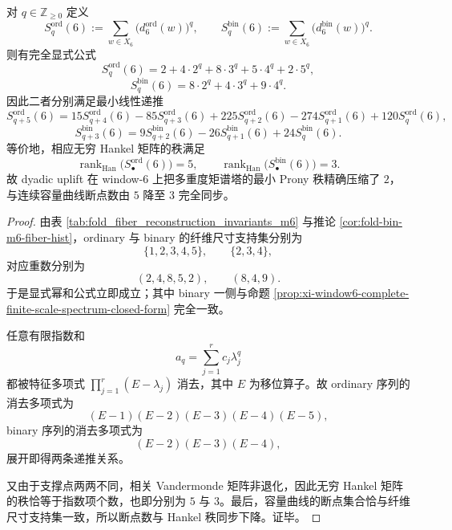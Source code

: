 \begin{theorem}\label{thm:conclusion-window6-moment-tower-prony-rank-compression}
对 \(q\in \mathbb Z_{\ge 0}\) 定义
\[
S_q^{\mathrm{ord}}(6):=\sum_{w\in X_6}\bigl(d_6^{\mathrm{ord}}(w)\bigr)^q,
\qquad
S_q^{\mathrm{bin}}(6):=\sum_{w\in X_6}\bigl(d_6^{\mathrm{bin}}(w)\bigr)^q.
\]
则有完全显式公式
\[
S_q^{\mathrm{ord}}(6)=2+4\cdot 2^q+8\cdot 3^q+5\cdot 4^q+2\cdot 5^q,
\]
\[
S_q^{\mathrm{bin}}(6)=8\cdot 2^q+4\cdot 3^q+9\cdot 4^q.
\]
因此二者分别满足最小线性递推
\[
S_{q+5}^{\mathrm{ord}}(6)
=15S_{q+4}^{\mathrm{ord}}(6)
-85S_{q+3}^{\mathrm{ord}}(6)
+225S_{q+2}^{\mathrm{ord}}(6)
-274S_{q+1}^{\mathrm{ord}}(6)
+120S_q^{\mathrm{ord}}(6),
\]
\[
S_{q+3}^{\mathrm{bin}}(6)
=9S_{q+2}^{\mathrm{bin}}(6)-26S_{q+1}^{\mathrm{bin}}(6)+24S_q^{\mathrm{bin}}(6).
\]
等价地，相应无穷 Hankel 矩阵的秩满足
\[
\operatorname{rank}_{\mathrm{Han}}\bigl(S_\bullet^{\mathrm{ord}}(6)\bigr)=5,
\qquad
\operatorname{rank}_{\mathrm{Han}}\bigl(S_\bullet^{\mathrm{bin}}(6)\bigr)=3.
\]
故 dyadic uplift 在 window-\(6\) 上把多重度矩谱塔的最小 Prony 秩精确压缩了 \(2\)，与连续容量曲线断点数由 \(5\) 降至 \(3\) 完全同步。
\end{theorem}
\begin{proof}
由表 \ref{tab:fold_fiber_reconstruction_invariants_m6} 与推论 \ref{cor:fold-bin-m6-fiber-hist}，ordinary 与 binary 的纤维尺寸支持集分别为
\[
\{1,2,3,4,5\},
\qquad
\{2,3,4\},
\]
对应重数分别为
\[
(2,4,8,5,2),
\qquad
(8,4,9).
\]
于是显式幂和公式立即成立；其中 binary 一侧与命题 \ref{prop:xi-window6-complete-finite-scale-spectrum-closed-form} 完全一致。

任意有限指数和
\[
a_q=\sum_{j=1}^{r} c_j\lambda_j^q
\]
都被特征多项式 \(\prod_{j=1}^{r}(E-\lambda_j)\) 消去，其中 \(E\) 为移位算子。故 ordinary 序列的消去多项式为
\[
(E-1)(E-2)(E-3)(E-4)(E-5),
\]
binary 序列的消去多项式为
\[
(E-2)(E-3)(E-4),
\]
展开即得两条递推关系。

又由于支撑点两两不同，相关 Vandermonde 矩阵非退化，因此无穷 Hankel 矩阵的秩恰等于指数项个数，也即分别为 \(5\) 与 \(3\)。最后，容量曲线的断点集合恰与纤维尺寸支持集一致，所以断点数与 Hankel 秩同步下降。证毕。
\end{proof}

